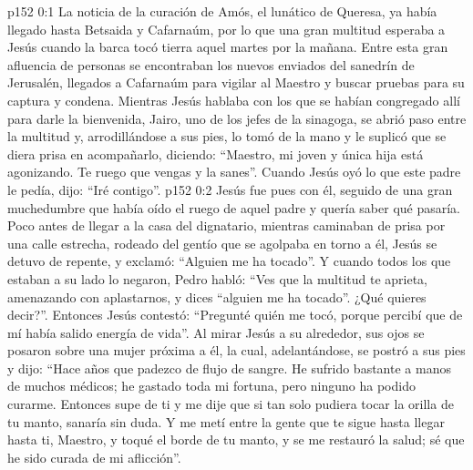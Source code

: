 \author{Comisión de seres intermedios}
\vs p152 0:1 La noticia de la curación de Amós, el lunático de Queresa, ya había llegado hasta Betsaida y Cafarnaúm, por lo que una gran multitud esperaba a Jesús cuando la barca tocó tierra aquel martes por la mañana. Entre esta gran afluencia de personas se encontraban los nuevos enviados del sanedrín de Jerusalén, llegados a Cafarnaúm para vigilar al Maestro y buscar pruebas para su captura y condena. Mientras Jesús hablaba con los que se habían congregado allí para darle la bienvenida, Jairo, uno de los jefes de la sinagoga, se abrió paso entre la multitud y, arrodillándose a sus pies, lo tomó de la mano y le suplicó que se diera prisa en acompañarlo, diciendo: “Maestro, mi joven y única hija está agonizando. Te ruego que vengas y la sanes”. Cuando Jesús oyó lo que este padre le pedía, dijo: “Iré contigo”.
\vs p152 0:2 Jesús fue pues con él, seguido de una gran muchedumbre que había oído el ruego de aquel padre y quería saber qué pasaría. Poco antes de llegar a la casa del dignatario, mientras caminaban de prisa por una calle estrecha, rodeado del gentío que se agolpaba en torno a él, Jesús se detuvo de repente, y exclamó: “Alguien me ha tocado”. Y cuando todos los que estaban a su lado lo negaron, Pedro habló: “Ves que la multitud te aprieta, amenazando con aplastarnos, y dices “alguien me ha tocado”. ¿Qué quieres decir?”. Entonces Jesús contestó: “Pregunté quién me tocó, porque percibí que de mí había salido energía de vida”. Al mirar Jesús a su alrededor, sus ojos se posaron sobre una mujer próxima a él, la cual, adelantándose, se postró a sus pies y dijo: “Hace años que padezco de flujo de sangre. He sufrido bastante a manos de muchos médicos; he gastado toda mi fortuna, pero ninguno ha podido curarme. Entonces supe de ti y me dije que si tan solo pudiera tocar la orilla de tu manto, sanaría sin duda. Y me metí entre la gente que te sigue hasta llegar hasta ti, Maestro, y toqué el borde de tu manto, y se me restauró la salud; sé que he sido curada de mi aflicción”.
